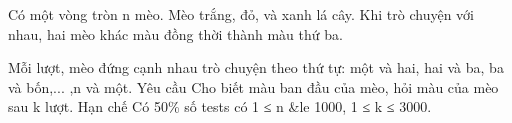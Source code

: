 Có một vòng tròn n mèo. Mèo trắng, đỏ, và xanh lá cây. Khi trò chuyện với nhau, hai mèo khác màu đồng thời thành màu thứ ba.

Mỗi lượt, mèo đứng cạnh nhau trò chuyện theo thứ tự: một và hai, hai và ba, ba và bốn,... ,n và một.
Yêu cầu
Cho biết màu ban đầu của mèo, hỏi màu của mèo sau k lượt.
Hạn chế
Có 50\% số tests có 1 ≤ n \&le 1000, 1 ≤ k ≤ 3000.